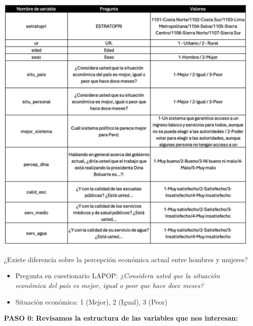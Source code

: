\documentclass[
]{article}
\newenvironment{Shaded}{\begin{snugshade}}{\end{snugshade}}
\newcommand{\AttributeTok}[1]{\textcolor[rgb]{0.77,0.63,0.00}{#1}}
\newcommand{\CommentTok}[1]{\textcolor[rgb]{0.56,0.35,0.01}{\textit{#1}}}
\newcommand{\DecValTok}[1]{\textcolor[rgb]{0.00,0.00,0.81}{#1}}
\newcommand{\FunctionTok}[1]{\textcolor[rgb]{0.00,0.00,0.00}{#1}}
\newcommand{\NormalTok}[1]{#1}
\newcommand{\OtherTok}[1]{\textcolor[rgb]{0.56,0.35,0.01}{#1}}
\newcommand{\SpecialCharTok}[1]{\textcolor[rgb]{0.00,0.00,0.00}{#1}}
\newcommand{\StringTok}[1]{\textcolor[rgb]{0.31,0.60,0.02}{#1}}
\providecommand{\tightlist}{%
  \setlength{\itemsep}{0pt}\setlength{\parskip}{0pt}}
\begin{document}
\includegraphics{diccionarioP7.jpeg}

¿Existe diferencia sobre la percepción económica actual entre hombres y
mujeres?

\begin{itemize}
\tightlist
\item
  Pregunta en cuestionario LAPOP: \emph{¿Considera usted que la
  situación económica del país es mejor, igual o peor que hace doce
  meses?}
\item
  Situación económica: 1 (Mejor), 2 (Igual), 3 (Peor)
\end{itemize}

\textbf{PASO 0: Revisamos la estructura de las variables que nos
interesan:}

\begin{Shaded}
\end{Shaded}
\end{document}
